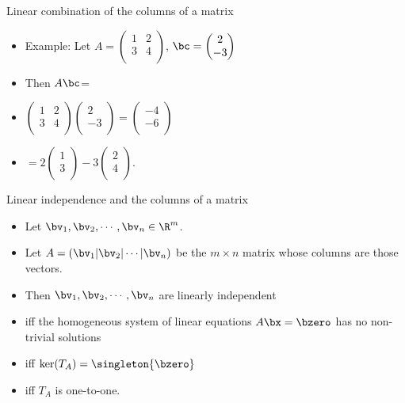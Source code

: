 \documentclass{beamer}
\begin{document}
\begin{frame}{Linear combination of the columns of a matrix}

\begin{itemize}
\item Example: Let
$A =
\begin{pmatrix}
1 & 2 \\
3 & 4 \\
\end{pmatrix}
$,
$\bc =
\begin{pmatrix}
2 \\
-3 \\
\end{pmatrix}
$
\item Then $A\bc$=
\item
$
\begin{pmatrix}
1 & 2 \\
3 & 4 \\
\end{pmatrix}
\begin{pmatrix}
2 \\
-3 \\
\end{pmatrix}
=
\begin{pmatrix}
-4 \\
-6 \\
\end{pmatrix}
$
\item
$ =
2
\begin{pmatrix}
1 \\
3 \\
\end{pmatrix}
-3
\begin{pmatrix}
2 \\
4 \\
\end{pmatrix}
$.
\end{itemize}
\end{frame}


\begin{frame}{Linear independence and the columns of a matrix}

\begin{itemize}
\item Let $\bv_1,\bv_2,\cdots,\bv_n \in \R^m$.
\item Let $A =\left ( \bv_1 \vert \bv_2 \vert \cdots \vert \bv_n \right)$
be the $m\times n$ matrix whose columns are those vectors.
\item Then $\bv_1,\bv_2,\cdots,\bv_n$ are linearly independent
\item iff the homogeneous system of linear equations $A\bx=\bzero$ has no non-trivial solutions
\item iff $\ker(T_A) = \singleton{\bzero}$
\item iff $T_A$ is one-to-one.
\end{itemize}

\end{frame}
\end{document}
